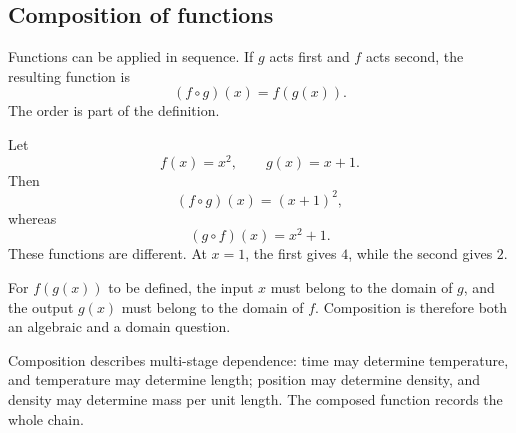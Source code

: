 \subsection{Composition of functions}

Functions can be applied in sequence. If \(g\) acts first and \(f\) acts second, the resulting function is
\[
(f\circ g)(x)=f(g(x)).
\]
The order is part of the definition.

\begin{examplebox}
Let
\[
f(x)=x^2,
\qquad
g(x)=x+1.
\]
Then
\[
(f\circ g)(x)=(x+1)^2,
\]
whereas
\[
(g\circ f)(x)=x^2+1.
\]
These functions are different. At \(x=1\), the first gives \(4\), while the second gives \(2\).
\end{examplebox}

\begin{corebox}
For \(f(g(x))\) to be defined, the input \(x\) must belong to the domain of \(g\), and the output \(g(x)\) must belong to the domain of \(f\). Composition is therefore both an algebraic and a domain question.
\end{corebox}

\begin{interpretationbox}
Composition describes multi-stage dependence: time may determine temperature, and temperature may determine length; position may determine density, and density may determine mass per unit length. The composed function records the whole chain.
\end{interpretationbox}
